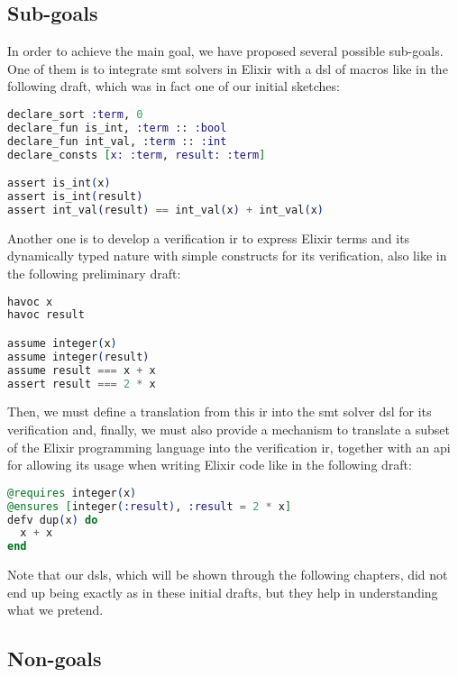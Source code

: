 \subsection{Sub-goals}

In order to achieve the main goal, we have proposed several possible sub-goals.
One of them is to integrate \acrshort{smt} solvers in Elixir with a \gls{dsl} of
macros like in the following draft, which was in fact one of our initial
sketches:

\begin{lstlisting}[language=elixir,numbers=none,frame=none]
declare_sort :term, 0
declare_fun is_int, :term :: :bool
declare_fun int_val, :term :: :int
declare_consts [x: :term, result: :term]

assert is_int(x)
assert is_int(result)
assert int_val(result) == int_val(x) + int_val(x)
\end{lstlisting}

Another one is to develop a verification \gls{ir} to express Elixir terms and
its dynamically typed nature with simple constructs for its verification, also
like in the following preliminary draft:

\begin{lstlisting}[language=elixir,numbers=none,frame=none]
havoc x
havoc result

assume integer(x)
assume integer(result)
assume result === x + x
assert result === 2 * x 
\end{lstlisting}

Then, we must define a translation from this \gls{ir} into the \acrshort{smt}
solver \gls{dsl} for its verification and, finally, we must also provide a
mechanism to translate a subset of the Elixir programming language into the
verification \gls{ir}, together with an \gls{api} for allowing its usage when
writing Elixir code like in the following draft:

\begin{lstlisting}[language=elixir,numbers=none,frame=none]
@requires integer(x)
@ensures [integer(:result), :result = 2 * x]
defv dup(x) do
  x + x
end
\end{lstlisting}

Note that our \gls{dsl}s, which will be shown through the following chapters,
did not end up being exactly as in these initial drafts, but they help in 
understanding what we pretend.

\subsection{Non-goals}


